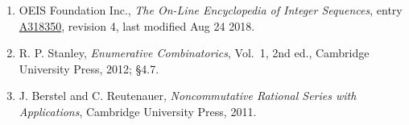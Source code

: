 \documentclass[11pt]{article}
\theoremstyle{definition}
\begin{document}
\begin{enumerate}

\item OEIS Foundation Inc., \emph{The On-Line Encyclopedia of Integer Sequences}, entry \href{https://oeis.org/A318350}{A318350}, revision 4, last modified Aug 24 2018.

\item R. P. Stanley, \emph{Enumerative Combinatorics}, Vol.~1, 2nd ed., Cambridge University Press, 2012; \S4.7.

\item J. Berstel and C. Reutenauer, \emph{Noncommutative Rational Series with Applications}, Cambridge University Press, 2011.

\end{enumerate}
\end{document}
